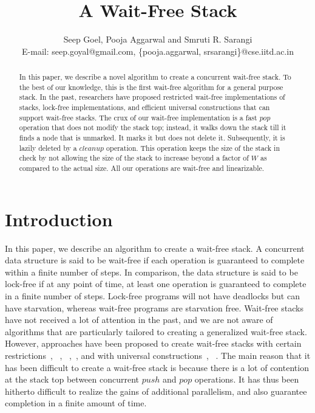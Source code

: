 \documentclass{llncs}
\title{A Wait-Free Stack}
\author{Seep Goel, Pooja Aggarwal and Smruti R. Sarangi \\
E-mail: seep.goyal@gmail.com, \{pooja.aggarwal, srsarangi\}@cse.iitd.ac.in
\institute{Indian Institute of Technology, New Delhi, India} }
\begin{document}
\maketitle
\begin{abstract}
In this paper, we describe a novel algorithm to create a concurrent wait-free stack. To the best
of our knowledge, this is the first wait-free algorithm for a general purpose stack. In the past,
researchers have proposed restricted wait-free implementations of stacks, lock-free implementations,
and efficient universal constructions that can support wait-free stacks. The crux of our
wait-free implementation is a fast $pop$ operation that does not modify the stack top; instead,
it walks down the stack till it finds a node that is unmarked. It marks it but does not delete it.
Subsequently, it is lazily deleted by a $cleanup$ operation. 
This operation keeps the size of the stack in check by not allowing the size of the stack to 
increase beyond a factor of $W$ as compared to 
the actual size. All our operations are wait-free and linearizable.
\end{abstract}
\section{Introduction}
\label{sec:intro}
In this paper, we describe an algorithm to create a wait-free stack. A concurrent data structure is said to be
wait-free if each operation is guaranteed to complete within a finite number of steps. In comparison, the data
structure is said to be lock-free if at any point of time, at least one operation is guaranteed to complete
in a finite number of steps. Lock-free programs will not have deadlocks but can have starvation, whereas
wait-free programs are starvation free. Wait-free stacks have not received
a lot of attention in the past, and we are not aware of algorithms that are particularly tailored to creating
a generalized wait-free stack. However, approaches have been proposed to create wait-free stacks with certain
restrictions~\cite{arrayBased}, ~\cite{restrictedStack}, ~\cite{WaitFreeSharedCounter1},~\cite{WaitFreeSharedCounter2}, 
and with universal constructions~\cite{oldUniversal}, ~\cite{newUniversal}. The main reason that it has been 
difficult to create a wait-free stack is because there
is a lot of contention at the stack top between concurrent $push$ and $pop$ operations. It has thus been
hitherto difficult to realize the gains of additional parallelism, and also guarantee completion in a finite
amount of time.
\end{document}
